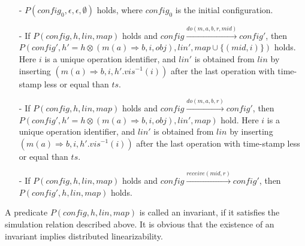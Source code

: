 \begin{itemize}
\setlength{\itemsep}{0.5pt}
\item[-] $P(\mathit{config}_0,\epsilon,\epsilon,\emptyset)$ holds, where $\mathit{config}_0$ is the initial configuration.

\item[-] If $P(\mathit{config},h,\mathit{lin},\mathit{map})$ holds and $\mathit{config} {\xrightarrow{\mathit{do}(m,a,b,r,\mathit{mid})}} \mathit{config}'$, then $P(\mathit{config}', h' = h \otimes (m(a) \Rightarrow b,i,\mathit{obj}),\mathit{lin}',\mathit{map} \cup \{ (\mathit{mid}, i) \})$ holds. Here $i$ is a unique operation identifier, and $\mathit{lin}'$ is obtained from $\mathit{lin}$ by inserting $(m(a) \Rightarrow b,i,h'.\mathit{vis}^{-1}(i))$ after the last operation with time-stamp less or equal than $\mathit{ts}$.

\item[-] If $P(\mathit{config},h,\mathit{lin},\mathit{map})$ holds and $\mathit{config} {\xrightarrow{\mathit{do}(m,a,b,r)}} \mathit{config}'$, then $P(\mathit{config}',h' = h \otimes (m(a) \Rightarrow b,i,\mathit{obj}),\mathit{lin}',\mathit{map})$ hold. Here $i$ is a unique operation identifier, and $\mathit{lin}'$ is obtained from $\mathit{lin}$ by inserting $(m(a) \Rightarrow b,i,h'.\mathit{vis}^{-1}(i))$ after the last operation with time-stamp less or equal than $\mathit{ts}$.

\item[-] If $P(\mathit{config},h,\mathit{lin},\mathit{map})$ holds and $\mathit{config} {\xrightarrow{\mathit{receive}(\mathit{mid},r)}} \mathit{config}'$, then $P(\mathit{config}',h,\mathit{lin},\mathit{map})$ holds.
\end{itemize} 

A predicate $P(\mathit{config},h,\mathit{lin},\mathit{map})$ is called an invariant, if it satisfies the simulation relation described above. It is obvious that the existence of an invariant implies distributed linearizability. 





